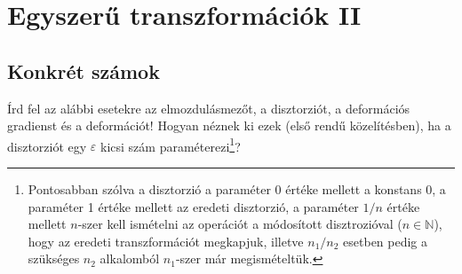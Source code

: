 \documentclass[12pt,a4paper]{scrartcl}
\begin{document}
\section{Egyszerű transzformációk II}
\subsection{Konkrét számok}
Írd fel az alábbi esetekre az elmozdulásmezőt, a disztorziót, a deformációs gradienst és a deformációt! Hogyan néznek ki ezek (első rendű közelítésben), ha a disztorziót egy $\varepsilon$ kicsi szám paraméterezi\footnote{Pontosabban szólva a disztorzió a paraméter 0 értéke mellett a konstans 0, a paraméter 1 értéke mellett az eredeti disztorzió, a paraméter $1/n$ értéke mellett $n$-szer kell ismételni az operációt a módosított disztrozióval ($n \in \mathbb{N}$), hogy az eredeti transzformációt megkapjuk, illetve $n_1/n_2$ esetben pedig a szükséges $n_2$ alkalomból $n_1$-szer már megismételtük.}?
\end{document}
